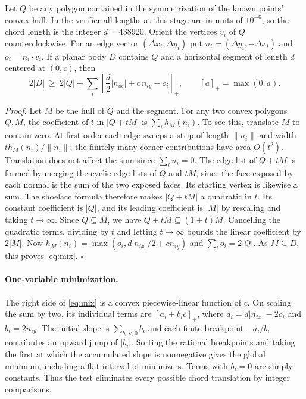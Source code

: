 Let $Q$ be any polygon contained in the symmetrization of the known points'
convex hull. In the verifier all lengths at this stage are in units of
$10^{-6}$, so the chord length is the integer $d=438920$. Orient the
vertices $v_i$ of $Q$ counterclockwise. For an edge vector
$(\Delta x_i,\Delta y_i)$ put $n_i=(\Delta y_i,-\Delta x_i)$ and
$o_i=n_i\cdot v_i$. If a planar body $D$ contains $Q$ and a horizontal
segment of length $d$ centered at $(0,c)$, then
\[
 2|D|\ \ge\ 2|Q|+\sum_i
 \left[\frac{d}{2}|n_{ix}|+c\,n_{iy}-o_i\right]_+,
 \qquad [a]_+=\max(0,a).                         \tag{3}\label{eq:mix}
\]

\emph{Proof.} Let $M$ be the hull of $Q$ and the segment. For any two
convex polygons $Q,M$, the coefficient of $t$ in $|Q+tM|$ is
$\sum_i h_M(n_i)$. To see this, translate $M$ to contain zero. At
first order each edge sweeps a strip of length $\|n_i\|$ and width
$t h_M(n_i)/\|n_i\|$; the finitely many corner contributions have
area $O(t^2)$. Translation does not affect the sum since $\sum_i n_i=0$.
The edge list of $Q+tM$ is formed by merging the cyclic edge lists
of $Q$ and $tM$, since the face exposed by each normal is the sum of
the two exposed faces. Its starting vertex is likewise a sum. The
shoelace formula therefore makes $|Q+tM|$ a quadratic in $t$.
Its constant coefficient is $|Q|$, and its leading coefficient is
$|M|$ by rescaling and taking $t\to\infty$. Since $Q\subseteq M$,
we have $Q+tM\subseteq(1+t)M$. Cancelling the quadratic terms,
dividing by $t$ and letting $t\to\infty$ bounds the linear coefficient
by $2|M|$. Now $h_M(n_i)=\max(o_i,d|n_{ix}|/2+c n_{iy})$ and
$\sum_i o_i=2|Q|$. As $M\subseteq D$, this proves \eqref{eq:mix}.
\hfill$\square$

\paragraph{One-variable minimization.}
The right side of \eqref{eq:mix} is a convex piecewise-linear function
of $c$. On scaling the sum by two, its individual terms are
$[a_i+b_i c]_+$, where $a_i=d|n_{ix}|-2o_i$ and $b_i=2n_{iy}$.
The initial slope is $\sum_{b_i<0} b_i$ and each finite breakpoint
$-a_i/b_i$ contributes an upward jump of $|b_i|$. Sorting the rational
breakpoints and taking the first at which the accumulated slope is
nonnegative gives the global minimum, including a flat interval of
minimizers. Terms with $b_i=0$ are simply constants. Thus the test
eliminates every possible chord translation by integer comparisons.

